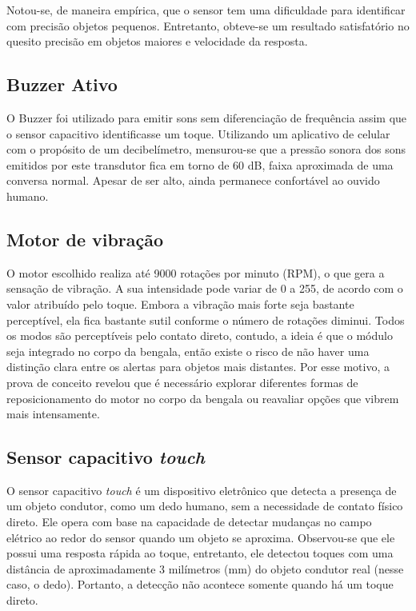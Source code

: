 Notou-se, de maneira empírica, que o sensor tem uma dificuldade para identificar com precisão objetos pequenos. Entretanto, obteve-se um resultado satisfatório no quesito precisão em objetos maiores e velocidade da resposta.

\subsection{Buzzer Ativo}
O Buzzer foi utilizado para emitir sons sem diferenciação de frequência assim que o sensor capacitivo identificasse um toque. Utilizando um aplicativo de celular com o propósito de um decibelímetro, mensurou-se que a pressão sonora dos sons emitidos por este transdutor fica em torno de 60 dB, faixa aproximada de uma conversa normal. Apesar de ser alto, ainda permanece confortável ao ouvido humano.

\subsection{Motor de vibração}
O motor escolhido realiza até 9000 rotações por minuto (RPM), o que gera a sensação de vibração. A sua intensidade pode variar de 0 a 255, de acordo com o valor atribuído pelo toque. Embora a vibração mais forte seja bastante perceptível, ela fica bastante sutil conforme o número de rotações diminui. Todos os modos são perceptíveis pelo contato direto, contudo, a ideia é que o módulo seja integrado no corpo da bengala, então existe o risco de não haver uma distinção clara entre os alertas para objetos mais distantes. Por esse motivo, a prova de conceito revelou que é necessário explorar diferentes formas de reposicionamento do motor no corpo da bengala ou reavaliar opções que vibrem mais intensamente.

\subsection{Sensor capacitivo \textit{touch}}

O sensor capacitivo \textit{touch} é um dispositivo eletrônico que detecta a presença de um objeto condutor, como um dedo humano, sem a necessidade de contato físico direto. Ele opera com base na capacidade de detectar mudanças no campo elétrico ao redor do sensor quando um objeto se aproxima. Observou-se que ele possui uma resposta rápida ao toque, entretanto, ele detectou toques com uma distância de aproximadamente 3 milímetros (mm) do objeto condutor real (nesse caso, o dedo). Portanto, a detecção não acontece somente quando há um toque direto.

